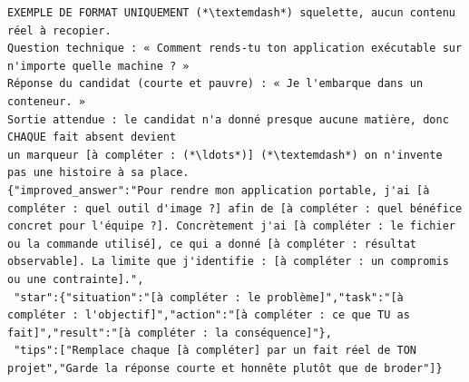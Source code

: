 \begin{lstlisting}[style=adamprompt]
EXEMPLE DE FORMAT UNIQUEMENT (*\textemdash*) squelette, aucun contenu réel à recopier.
Question technique : « Comment rends-tu ton application exécutable sur n'importe quelle machine ? »
Réponse du candidat (courte et pauvre) : « Je l'embarque dans un conteneur. »
Sortie attendue : le candidat n'a donné presque aucune matière, donc CHAQUE fait absent devient
un marqueur [à compléter : (*\ldots*)] (*\textemdash*) on n'invente pas une histoire à sa place.
{"improved_answer":"Pour rendre mon application portable, j'ai [à compléter : quel outil d'image ?] afin de [à compléter : quel bénéfice concret pour l'équipe ?]. Concrètement j'ai [à compléter : le fichier ou la commande utilisé], ce qui a donné [à compléter : résultat observable]. La limite que j'identifie : [à compléter : un compromis ou une contrainte].",
 "star":{"situation":"[à compléter : le problème]","task":"[à compléter : l'objectif]","action":"[à compléter : ce que TU as fait]","result":"[à compléter : la conséquence]"},
 "tips":["Remplace chaque [à compléter] par un fait réel de TON projet","Garde la réponse courte et honnête plutôt que de broder"]}
\end{lstlisting}
